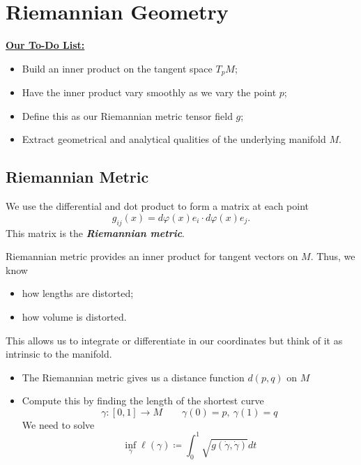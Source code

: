 \documentclass[UKenglish]{beamer}
\newcommand\boldgreen[1]{\textcolor{lighter_csu_green}{\emph{\textbf{#1}}}}
\begin{document}
\begin{frame}{}
\vfill
\begin{figure}[H]
	\centering
	\def\svgwidth{\columnwidth}
	
\end{figure}
\vfill
\end{frame}

\section{Riemannian Geometry}

\begin{frame}{}
\vfill
\textbf{\underline{Our To-Do List:}}
\begin{itemize}
	\item Build an inner product on the tangent space $T_pM$;
	\pause
	\item Have the inner product vary smoothly as we vary the point $p$;
	\pause
	\item Define this as our Riemannian metric tensor field $g$;
	\pause
	\item Extract geometrical and analytical qualities of the underlying manifold $M$.
\end{itemize}
\vfill
\end{frame}


\subsection{Riemannian Metric}

\begin{frame}{}
	\vfill
	We use the differential and dot product to form a matrix at each point
	\[
	g_{ij}(x) = d\varphi(x)e_i \cdot d\varphi(x)e_j.
	\]
	\pause
	This matrix is the \boldgreen{Riemannian metric}.
	\vfill
\end{frame}

\begin{frame}{}
	\vfill
	Riemannian metric provides an inner product for tangent vectors on $M$. Thus, we know
	\begin{itemize}
		\item how lengths are distorted;
		\item how volume is distorted.
	\end{itemize}
	This allows us to integrate or differentiate in our coordinates but think of it as intrinsic to the manifold.
	\vfill
\end{frame}

\begin{frame}{}
	\vfill
	\begin{itemize}
		\item The Riemannian metric gives us a distance function $d(p,q)$ on $M$
		\pause
		\item Compute this by finding the length of the shortest curve 
		\[
		\gamma\colon [0,1]\to M \qquad \gamma(0)=p,~\gamma(1)=q
		\]
		\pause
		We need to solve
		\[
		\inf_{\gamma} \ell(\gamma) \coloneqq \int_0^1 \sqrt{g(\dot{\gamma},\dot{\gamma})}dt
		\]
	\end{itemize}
\end{frame}
\end{document}

